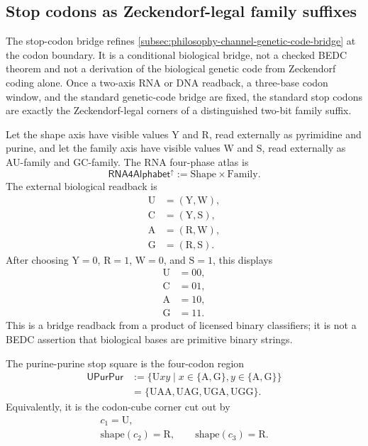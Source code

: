 \subsection{Stop codons as Zeckendorf-legal family suffixes}
\label{subsec:philosophy-stop-codon-zeckendorf-suffix-bridge}

The stop-codon bridge refines
\autoref{subsec:philosophy-channel-genetic-code-bridge} at the codon
boundary. It is a conditional biological bridge, not a checked BEDC
theorem and not a derivation of the biological genetic code from
Zeckendorf coding alone. Once a two-axis RNA or DNA readback, a
three-base codon window, and the standard genetic-code bridge are fixed,
the standard stop codons are exactly the Zeckendorf-legal corners of a
distinguished two-bit family suffix.

\begin{definition}
\label{def:philosophy-rna-two-axis-readback}
Let the shape axis have visible values $\mathrm{Y}$ and $\mathrm{R}$,
read externally as pyrimidine and purine, and let the family axis have
visible values $\mathrm{W}$ and $\mathrm{S}$, read externally as
AU-family and GC-family. The RNA four-phase atlas is
$$
  \mathsf{RNA4Alphabet}^{\uparrow}
  :=
  \mathrm{Shape}\times\mathrm{Family}.
$$
The external biological readback is
$$
\begin{aligned}
  \mathrm{U} &= (\mathrm{Y},\mathrm{W}),\\
  \mathrm{C} &= (\mathrm{Y},\mathrm{S}),\\
  \mathrm{A} &= (\mathrm{R},\mathrm{W}),\\
  \mathrm{G} &= (\mathrm{R},\mathrm{S}).
\end{aligned}
$$
After choosing $\mathrm{Y}=0$, $\mathrm{R}=1$, $\mathrm{W}=0$, and
$\mathrm{S}=1$, this displays
$$
\begin{aligned}
  \mathrm{U} &= 00,\\
  \mathrm{C} &= 01,\\
  \mathrm{A} &= 10,\\
  \mathrm{G} &= 11.
\end{aligned}
$$
This is a bridge readback from a product of licensed binary classifiers;
it is not a BEDC assertion that biological bases are primitive binary
strings.
\end{definition}

\begin{definition}
\label{def:philosophy-purine-purine-stop-square}
The purine-purine stop square is the four-codon region
$$
\begin{aligned}
  \mathsf{UPurPur}
  &:=\{\mathrm{U}xy\mid x\in\{\mathrm{A},\mathrm{G}\},
        y\in\{\mathrm{A},\mathrm{G}\}\}\\
  &=\{\mathrm{UAA},\mathrm{UAG},\mathrm{UGA},\mathrm{UGG}\}.
\end{aligned}
$$
Equivalently, it is the codon-cube corner cut out by
$$
\begin{gathered}
  c_{1}=\mathrm{U},\\
  \mathrm{shape}(c_{2})=\mathrm{R},\qquad
  \mathrm{shape}(c_{3})=\mathrm{R}.
\end{gathered}
$$
\end{definition}

